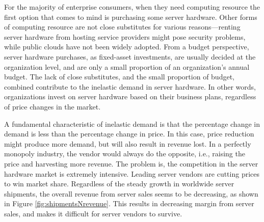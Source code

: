 \documentclass[10pt,journal,cspaper,compsoc]{IEEEtran}
\begin{document}
For the majority of enterprise consumers, when they need computing resource the first option that comes to mind is purchasing some server hardware. Other forms of computing resource are not close substitutes for various reasons---renting server hardware from hosting service providers might pose security problems, while public clouds have not been widely adopted. From a budget perspective, server hardware purchases, as fixed-asset investments, are usually decided at the organization level, and are only a small proportion of an organization's annual budget. The lack of close substitutes, and the small proportion of budget, combined contribute to the inelastic demand in server hardware. In other words, organizations invest on server hardware based on their business plans, regardless of price changes in the market. 

A fundamental characteristic of inelastic demand is that the percentage change in demand is less than the percentage change in price. In this case, price reduction might produce more demand, but will also result in revenue lost. In a perfectly monopoly industry, the vendor would always do the opposite, i.e., raising the price and harvesting more revenue. The problem is, the competition in the server hardware market is extremely intensive. Leading server vendors are cutting prices to win market share. Regardless of the steady growth in worldwide server shipments, the overall revenue from server sales seems to be decreasing, as shown in Figure \ref{fig:shipmentsNrevenue}. This results in decreasing margin from server sales, and makes it difficult for server vendors to survive. 
\end{document}
